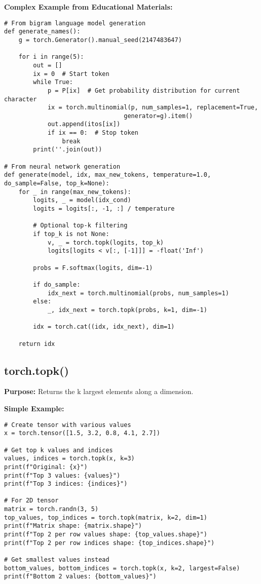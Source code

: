 \documentclass[11pt,a4paper]{book}
\begin{document}
\textbf{Complex Example from Educational Materials:}
\begin{verbatim}
# From bigram language model generation
def generate_names():
    g = torch.Generator().manual_seed(2147483647)
    
    for i in range(5):
        out = []
        ix = 0  # Start token
        while True:
            p = P[ix]  # Get probability distribution for current character
            ix = torch.multinomial(p, num_samples=1, replacement=True, 
                                 generator=g).item()
            out.append(itos[ix])
            if ix == 0:  # Stop token
                break
        print(''.join(out))

# From neural network generation  
def generate(model, idx, max_new_tokens, temperature=1.0, do_sample=False, top_k=None):
    for _ in range(max_new_tokens):
        logits, _ = model(idx_cond)
        logits = logits[:, -1, :] / temperature
        
        # Optional top-k filtering
        if top_k is not None:
            v, _ = torch.topk(logits, top_k)
            logits[logits < v[:, [-1]]] = -float('Inf')
        
        probs = F.softmax(logits, dim=-1)
        
        if do_sample:
            idx_next = torch.multinomial(probs, num_samples=1)
        else:
            _, idx_next = torch.topk(probs, k=1, dim=-1)
        
        idx = torch.cat((idx, idx_next), dim=1)
    
    return idx
\end{verbatim}

\subsection{torch.topk()}

\textbf{Purpose:} Returns the k largest elements along a dimension.

\textbf{Simple Example:}
\begin{verbatim}
# Create tensor with various values
x = torch.tensor([1.5, 3.2, 0.8, 4.1, 2.7])

# Get top k values and indices
values, indices = torch.topk(x, k=3)
print(f"Original: {x}")
print(f"Top 3 values: {values}")
print(f"Top 3 indices: {indices}")

# For 2D tensor
matrix = torch.randn(3, 5)
top_values, top_indices = torch.topk(matrix, k=2, dim=1)
print(f"Matrix shape: {matrix.shape}")
print(f"Top 2 per row values shape: {top_values.shape}")
print(f"Top 2 per row indices shape: {top_indices.shape}")

# Get smallest values instead
bottom_values, bottom_indices = torch.topk(x, k=2, largest=False)
print(f"Bottom 2 values: {bottom_values}")
\end{verbatim}
\end{document}
